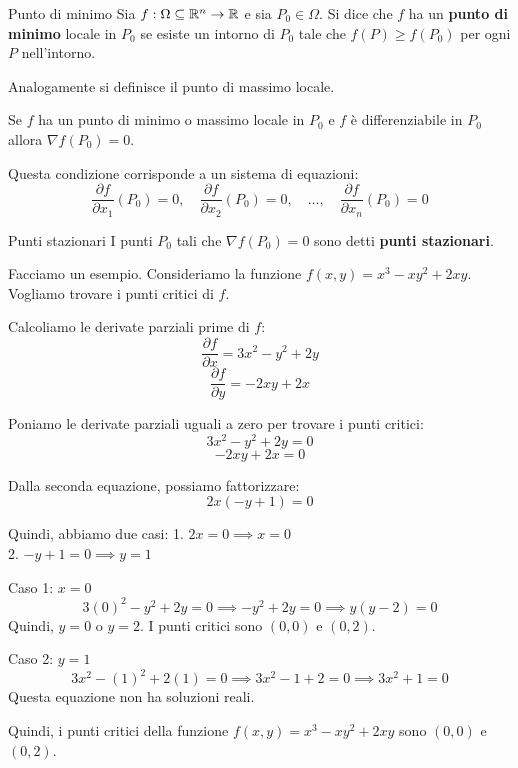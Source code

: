 \begin{definizione}{Punto di minimo}
  Sia $f:\Omega \subseteq \mathbb{R}^n \rightarrow \mathbb{R}$ e sia $P_0 \in \Omega$. Si dice che $f$ ha un \textbf{punto di minimo} locale in $P_0$ se esiste un intorno di $P_0$ tale che $f(P) \geq f(P_0)$ per ogni $P$ nell'intorno.
\end{definizione}
Analogamente si definisce il punto di massimo locale.
\begin{teorema}{}
  Se $f$ ha un punto di minimo o massimo locale in $P_0$ e $f$ è differenziabile in $P_0$ allora $\nabla f(P_0) = 0$.
\end{teorema}


\begin{osservazione}{}
  Questa condizione corrisponde a un sistema di equazioni:
  \[
  \frac{\partial f}{\partial x_1}(P_0) = 0, \quad \frac{\partial f}{\partial x_2}(P_0) = 0, \quad \dots, \quad \frac{\partial f}{\partial x_n}(P_0) = 0
  \]
\end{osservazione}

\begin{definizione}{Punti stazionari}
  I punti $P_0$ tali che $\nabla f(P_0) = 0$ sono detti \textbf{punti stazionari}.
\end{definizione}

Facciamo un esempio.
Consideriamo la funzione $f(x,y) = x^3 - xy^2 + 2xy$. Vogliamo trovare i punti critici di $f$.

Calcoliamo le derivate parziali prime di $f$:
\[
\frac{\partial f}{\partial x} = 3x^2 - y^2 + 2y
\]
\[
\frac{\partial f}{\partial y} = -2xy + 2x
\]

Poniamo le derivate parziali uguali a zero per trovare i punti critici:
\[
3x^2 - y^2 + 2y = 0
\]
\[
-2xy + 2x = 0
\]

Dalla seconda equazione, possiamo fattorizzare:
\[
2x(-y + 1) = 0
\]

Quindi, abbiamo due casi:
1. $2x = 0 \implies x = 0$\\
2. $-y + 1 = 0 \implies y = 1$

Caso 1: $x = 0$
\[
3(0)^2 - y^2 + 2y = 0 \implies -y^2 + 2y = 0 \implies y(y - 2) = 0
\]
Quindi, $y = 0$ o $y = 2$. I punti critici sono $(0,0)$ e $(0,2)$.

Caso 2: $y = 1$
\[
3x^2 - (1)^2 + 2(1) = 0 \implies 3x^2 - 1 + 2 = 0 \implies 3x^2 + 1 = 0
\]
Questa equazione non ha soluzioni reali.

Quindi, i punti critici della funzione $f(x,y) = x^3 - xy^2 + 2xy$ sono $(0,0)$ e $(0,2)$.\\

